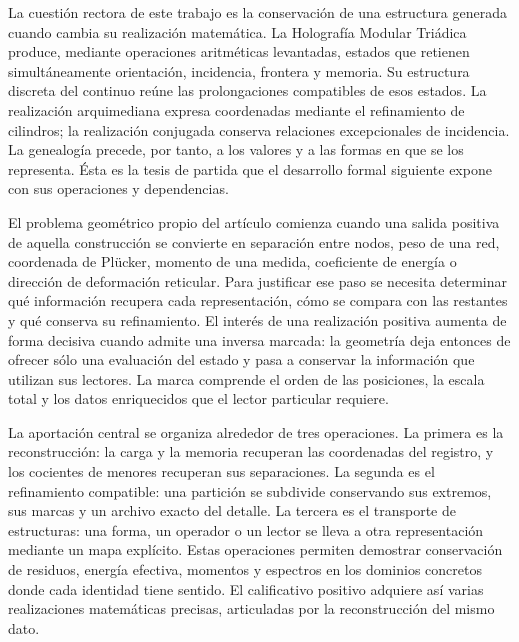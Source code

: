 La cuestión rectora de este trabajo es la conservación de una estructura
generada cuando cambia su realización matemática. La Holografía Modular
Triádica produce, mediante operaciones aritméticas levantadas, estados que
retienen simultáneamente orientación, incidencia, frontera y memoria. Su
estructura discreta del continuo reúne las prolongaciones compatibles de
esos estados. La realización arquimediana expresa coordenadas mediante el
refinamiento de cilindros; la realización conjugada conserva relaciones
excepcionales de incidencia. La genealogía precede, por tanto, a los valores
y a las formas en que se los representa. Ésta es la tesis de partida que el
desarrollo formal siguiente expone con sus operaciones y dependencias.

El problema geométrico propio del artículo comienza cuando una salida
positiva de aquella construcción se convierte en separación entre nodos,
peso de una red, coordenada de Plücker, momento de una medida, coeficiente
de energía o dirección de deformación reticular. Para justificar ese paso
se necesita determinar qué información recupera cada representación, cómo
se compara con las restantes y qué conserva su refinamiento. El interés
de una realización positiva aumenta de forma decisiva cuando admite una
inversa marcada: la geometría deja entonces de ofrecer sólo una evaluación
del estado y pasa a conservar la información que utilizan sus lectores.
La marca comprende el orden de las posiciones, la escala total y los datos
enriquecidos que el lector particular requiere.

La aportación central se organiza alrededor de tres operaciones. La primera
es la reconstrucción: la carga y la memoria recuperan las coordenadas
del registro, y los cocientes de menores recuperan sus separaciones.
La segunda es el refinamiento compatible: una partición se subdivide
conservando sus extremos, sus marcas y un archivo exacto del detalle.
La tercera es el transporte de estructuras: una forma, un operador o un
lector se lleva a otra representación mediante un mapa explícito. Estas
operaciones permiten demostrar conservación de residuos, energía efectiva,
momentos y espectros en los dominios concretos donde cada identidad tiene
sentido. El calificativo positivo adquiere así varias realizaciones
matemáticas precisas, articuladas por la reconstrucción del mismo dato.


